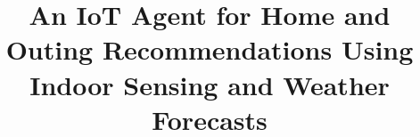 \documentclass[conference]{IEEEtran}
\begin{document}
\title{An IoT Agent for Home and Outing Recommendations Using Indoor Sensing and Weather Forecasts}

\author{
}

\maketitle

\nocite{yao2023react,
  uci_occupancy,
  tartarini2020cbe,
  cwa_open_data,
  cook2013casas,
  killick2012changepoints,
  shiffman2008ema,
  roberts2017cv,
  w3c2013provo,
  oasis2019mqtt}










\end{document}
